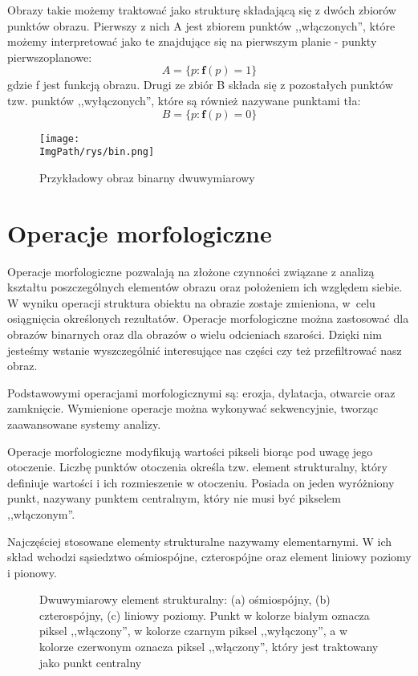 \documentclass[a4paper,12pt,twoside,openany]{report}
\newcommand{\ImgPath}{.}
\begin{document}
Obrazy takie możemy traktować jako strukturę składającą się z dwóch zbiorów punktów obrazu. Pierwszy z nich A jest zbiorem punktów ,,włączonych'', które możemy interpretować jako te znajdujące się na pierwszym planie - punkty pierwszoplanowe:
\begin{equation}
	 A = \{p \colon \textbf{f}(p) = 1\} 
\end{equation}
gdzie f jest funkcją obrazu. Drugi ze zbiór B składa się z pozostałych punktów tzw. punktów ,,wyłączonych'', które są również nazywane punktami tła:
\begin{equation}
	 B = \{p \colon \textbf{f}(p) = 0\} 
\end{equation}

\begin{figure}[H]	
	\centering
	\texttt{[image: \\ImgPath/rys/bin.png]}
	
	\caption{Przykładowy obraz binarny dwuwymiarowy}
\end{figure}

\section{Operacje morfologiczne}
Operacje morfologiczne pozwalają na złożone czynności związane z analizą kształtu poszczególnych elementów obrazu oraz położeniem ich względem siebie. W wyniku operacji struktura obiektu na obrazie zostaje zmieniona, w~celu osiągnięcia określonych rezultatów. 
Operacje morfologiczne można zastosować dla obrazów binarnych oraz dla obrazów o wielu odcieniach szarości\cite{Malina}. Dzięki nim jesteśmy wstanie wyszczególnić interesujące nas części czy też przefiltrować nasz obraz. 

Podstawowymi operacjami morfologicznymi są: erozja, dylatacja, otwarcie oraz zamknięcie. Wymienione operacje można wykonywać sekwencyjnie, tworząc zaawansowane systemy analizy.

Operacje morfologiczne modyfikują wartości pikseli biorąc pod uwagę jego otoczenie. Liczbę punktów otoczenia określa tzw. element strukturalny, który definiuje wartości i ich rozmieszenie w otoczeniu. Posiada on jeden wyróżniony punkt, nazywany punktem centralnym, który nie musi być pikselem ,,włączonym''\cite{Iwanowski}. 

Najczęściej stosowane elementy strukturalne nazywamy elementarnymi. W ich skład wchodzi sąsiedztwo ośmiospójne, czterospójne oraz element liniowy poziomy i pionowy.

\begin{figure}[H]
	\centering
	\caption{Dwuwymiarowy element strukturalny: (a) ośmiospójny, (b) czterospójny, (c) liniowy poziomy. Punkt w kolorze białym oznacza piksel ,,włączony'', w kolorze czarnym piksel ,,wyłączony'', a w kolorze czerwonym oznacza piksel ,,włączony'', który jest traktowany jako punkt centralny}
\end{figure}
\end{document}
